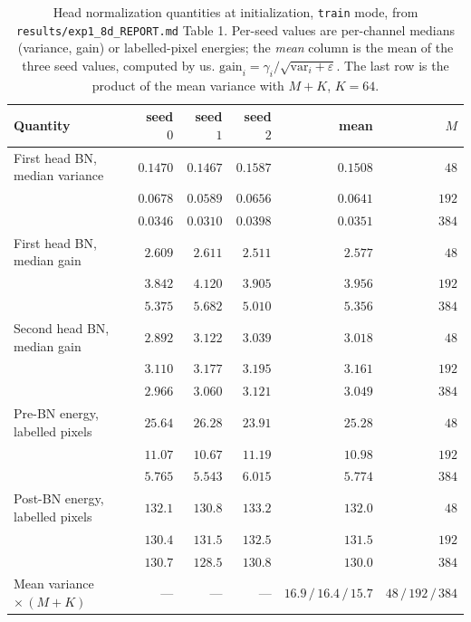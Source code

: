 \begin{table}[htbp]
\centering
\small
\caption{Head normalization quantities at initialization, \texttt{train} mode,
from \texttt{results/exp1\_8d\_REPORT.md} Table 1. Per-seed values are
per-channel medians (variance, gain) or labelled-pixel energies; the
\emph{mean} column is the mean of the three seed values, computed by us.
$\mathrm{gain}_i = \gamma_i/\sqrt{\mathrm{var}_i + \varepsilon}$. The last row
is the product of the mean variance with $M + K$, $K = 64$.}
\label{tab:app_bn}
\begin{tabular}{lrrrrr}
\toprule
Quantity & seed $0$ & seed $1$ & seed $2$ & mean & $M$ \\
\midrule
First head BN, median variance & $0.1470$ & $0.1467$ & $0.1587$ & $0.1508$ & $48$ \\
                               & $0.0678$ & $0.0589$ & $0.0656$ & $0.0641$ & $192$ \\
                               & $0.0346$ & $0.0310$ & $0.0398$ & $0.0351$ & $384$ \\
First head BN, median gain     & $2.609$ & $2.611$ & $2.511$ & $2.577$ & $48$ \\
                               & $3.842$ & $4.120$ & $3.905$ & $3.956$ & $192$ \\
                               & $5.375$ & $5.682$ & $5.010$ & $5.356$ & $384$ \\
Second head BN, median gain    & $2.892$ & $3.122$ & $3.039$ & $3.018$ & $48$ \\
                               & $3.110$ & $3.177$ & $3.195$ & $3.161$ & $192$ \\
                               & $2.966$ & $3.060$ & $3.121$ & $3.049$ & $384$ \\
Pre-BN energy, labelled pixels & $25.64$ & $26.28$ & $23.91$ & $25.28$ & $48$ \\
                               & $11.07$ & $10.67$ & $11.19$ & $10.98$ & $192$ \\
                               & $5.765$ & $5.543$ & $6.015$ & $5.774$ & $384$ \\
Post-BN energy, labelled pixels & $132.1$ & $130.8$ & $133.2$ & $132.0$ & $48$ \\
                                & $130.4$ & $131.5$ & $132.5$ & $131.5$ & $192$ \\
                                & $130.7$ & $128.5$ & $130.8$ & $130.0$ & $384$ \\
\midrule
Mean variance $\times\,(M{+}K)$ & --- & --- & --- & $16.9\,/\,16.4\,/\,15.7$ & $48\,/\,192\,/\,384$ \\
\bottomrule
\end{tabular}
\end{table}

